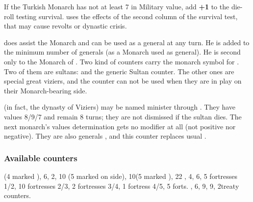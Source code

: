  If the Turkish
Monarch has not at least 7 in Military value, add {\bf +1} to the
die-roll testing survival.
\bparag \TUR uses the effects of the second column of the survival test,
that may cause revolts or dynastic crisis.

 does assist the Monarch and can be
used as a general  at any turn. He is added
to the minimum number of generals (as a Monarch used as general). He is
second only to the Monarch of \TUR.
\bparag \label{chSpecific:Turkey:Vizier}Two kind of counters carry the monarch
symbol for . Two of them are sultans:
 and the generic Sultan counter. The other ones are
special great viziers, and the \leaderSadrazam counter can not be
used when they are in play on their Monarch-bearing side.

 (in fact, the dynasty of Viziers) may
be named minister through . They have values
8/9/7 and remain 8 turns; they are not dismissed if the sultan dies. The
next monarch's values determination gets no modifier at all (not
positive nor negative).
\bparag They are also generals , and this
counter replaces usual \leaderSadrazam.

\subsubsection{Available counters}
\ARMY (4 marked \Timar), 6\FLEET, 2\corsaire, 10\LDND
(5 marked \Timar on \LD side), 10\LD (5 marked \Timar), 22 \Pashas, 4\NTD,
6\LDENDE, 5 fortresses 1/2, 10 fortresses 2/3, 2 fortresses 3/4, 1
fortress 4/5, 5 forts.
\COL, 6\TP, 9\MNU, 9\TradeFLEET, 2\ROTW treaty
counters.



